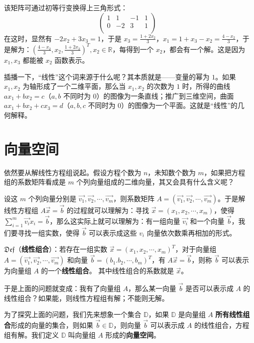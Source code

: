 \documentclass[b5paper]{ctexart}
\newcommand{\R}{\mathbb{R}}
\begin{document}
	该矩阵可通过初等行变换得上三角形式：
		\[
	\begin{pmatrix}
		1 & 1 & -1 & 1\\
		0 & -2 & 3 & 1 \\
	\end{pmatrix}
	\]
	在这时，显然有 $-2x_2 + 3x_3 = 1$，于是 $x_3 = \frac{1 + 2x_2}{3}$，$x_1 = 1 + x_3 - x_2 = \frac{4  - x_2}{3}$，于是解为：$(\frac{4  - x_2}{3}, x_2,  \frac{1 + 2x_2}{3})^T, x_2 \in \R$，每得到一个 $x_2$，都会有一个解。这是因为 $x_1, x_3$ 都能被 $x_2$ 函数表示。
	
	插播一下，“线性”这个词来源于什么呢？其本质就是——变量的幂为 $1$。如果 $x_1, x_2$ 为轴形成了一个二维平面，那么当 $x_1, x_2$ 的次数为 $1$ 时，所得的曲线 $ax_1 + bx_2 = c$（$a, b$ 不同时为 $0$）的图像为一条直线；推广到三维空间，曲面 $ax_1 + bx_2 + cx_3 = d$（$a, b, c$ 不同时为 $0$）的图像为一个平面。这就是“线性”的几何解释。
	
	\newpage
	\section{向量空间}
	
	依然要从解线性方程组说起。假设方程个数为 $n$，未知数个数为 $m$，如果把方程组的系数矩阵看成是 $m$ 个列向量组成的二维向量，其又会具有什么含义呢？
	
	设这 $m$ 个列向量分别是 $\vec{v_1}, \vec{v_2}, \cdots, \vec{v_m}$，则系数矩阵 $A = (\vec{v_1},\vec{ v_2}, \cdots, \vec{v_m})$。于是解线性方程组 $A\vec{x} = \vec{b}$ 的过程就可以理解为：寻找 $\vec{x} = (x_1, x_2, \cdots, x_m)$，使得 $\sum \limits_{i = 1}^m \vec{v_i} x_i = \vec{b}$，那么这实际上就可以理解为：有一组向量 $\vec{v_i}$ 和一个向量 $\vec{b}$，我们要寻找一组实数，使得 $\vec{b}$ 可以表示成这些 $v_i$ 向量依次数乘再相加的形式。
	
	\vspace{12pt}
	
	$\mathfrak{Def}$（\textbf{线性组合}）：若存在一组实数 $\vec{x} = (x_1, x_2, \cdots, x_m)^T$，对于向量组 $A = (\vec{v_1}, \vec{ v_2}, \cdots, \vec{v_m})$ 和向量 $\vec{b} = (b_1. b_2, \cdots, b_m)^T$，有 $A\vec{x} = \vec{b}$，则称 $\vec{b}$ 可以表示为向量组 $A$ 的一个\textbf{线性组合}。 其中线性组合的系数就是 $\vec{x}$。
	
	\vspace{12pt}
	
	于是上面的问题就变成：我有了向量组 $A$，那么某一向量 $\vec{b}$ 是否可以表示成 $A$ 的线性组合？如果能，则线性方程组有解；不能则无解。
	
	为了探究上面的问题，我们先来想象一个集合 $\mathbb{D}$，如果 $\mathbb{D}$ 是向量组 $A$ \textbf{所有线性组合}形成的向量的集合，则如果 $\vec{b} \in \mathbb{D}$，则向量 $\vec{b}$ 可以表示成 $A$ 的线性组合，方程组有解。我们定义 $\mathbb{D}$ 叫向量组 $A$ 形成的\textbf{向量空间}。
	
\end{document}
